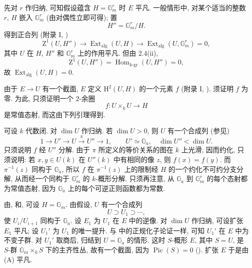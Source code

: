 先对 \(r\) 作归纳, 可知假设蕴含 \(H=\mathbb G_m^r\) 时 \(E\) 平凡.
一般情形中, 对某个适当的整数 \(r\), \(H\) 嵌入 \(\mathbb G_m^r\)
(由对偶性立即可得); 置
\[
  H''=\mathbb G_m^r/H.
\]
得到正合列 (附录 I, )
\[
  \mathrm Z^1(U,H'')
    \longrightarrow\operatorname{Ext}_{\mathrm{alg}}(U,H)
    \longrightarrow
      \operatorname{Ext}_{\mathrm{alg}}(U,\mathbb G_m^r)=0,
\]
其中 \(U\) 在 \(H\), \(H''\) 和 \(\mathbb G_m^r\) 上的作用平凡.
但由 2.4(ii),
\[
  \mathrm Z^1(U,H'')
    =\operatorname{Hom}_{k\text{-}\mathrm{gr}}(U,H'')=0,
\]
故 \(\operatorname{Ext}_{\mathrm{alg}}(U,H)=0\).

由于 \(E\longrightarrow U\) 有一个截面,
\(E\) 定义 \(\mathrm H^2(U,H)\) 的一个元素 \(f\)
(附录 I, ). 须证明 \(f\) 为零.
为此, 只须证明一个 \(2\)-余圈
\[
  f:U\times_kU\longrightarrow H
\]
是常值态射, 而这由下列引理得到.


可设 \(k\) 代数闭. 对 \(\dim U\) 作归纳.
若 \(\dim U>0\), 则 \(U\) 有一个合成列 (参见)
\[
  1\longrightarrow U'\longrightarrow U
    \xrightarrow{\ \pi\ }U''\longrightarrow1,
  \qquad
  U'\simeq\mathbb G_a,\quad \dim U''<\dim U.
\]
只须说明 \(f\) 经 \(U''\) 分解.
由于 \(\pi\) 所定义的等价关系的图在 \(k\) 上光滑, 因而约化,
只须说明: 若 \(x,y\in U(k)\) 在 \(U''(k)\) 中有相同的像 \(z\),
则 \(f(x)=f(y)\).
而 \(\pi^{-1}(z)\) 同构于 \(\mathbb G_a\),
所以 \(f\) 在 \(\pi^{-1}(z)\) 上的限制经 \(H\) 的一个约化不可约分支分解,
从而经一个同构于 \(\mathbb G_m^r\) 的 \(k\)-概形分解.
只须再注意, 从 \(\mathbb G_a\) 到 \(\mathbb G_m^r\) 的每个态射都为常值态射,
因为 \(\mathbb G_a\) 上的每个可逆正则函数都为常数.

由, 
和, 可设 \(H=\mathbb G_m\).
由假设, \(U\) 有一个合成列
\[
  U\supset U_1\supset\cdots,
\]
使 \(U_i/U_{i+1}\) 同构于 \(\mathbb G_a\).
设 \(E_1\) 为 \(U_1\) 在 \(E\) 中的逆像.
对 \(\dim U\) 作归纳, 可设扩张 \(E_1\) 平凡;
设 \(U_1'\) 为 \(U_1\) 的唯一提升.
与 中的正规化子论证一样,
可知 \(U_1'\) 在 \(E\) 中为不变子群.
对 \(U_1'\) 取商后, 归结到 \(U=\mathbb G_a\) 的情形.
这时 \(S\)-概形 \(E\), 其中 \(S=U\), 是 \(S\)-群 \(\mathbb G_m\times_kS\) 下的主齐性丛,
故有一个截面, 因为 \(\operatorname{Pic}(S)=0\)
().
扩张 \(E\) 于是由 (A) 平凡.

